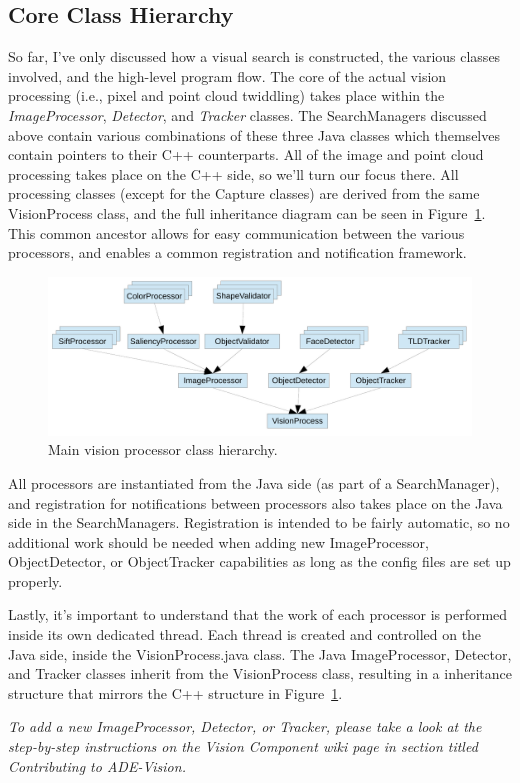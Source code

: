 \documentclass{article}
\begin{document}
\subsection{Core Class Hierarchy}
So far, I've only discussed how a visual search is constructed, the various
classes involved, and the high-level program flow. The core of the actual
vision processing (i.e., pixel and point cloud twiddling) takes place within
the {\em ImageProcessor}, {\em Detector}, and {\em Tracker} classes. The
SearchManagers discussed above contain various combinations of these
three Java classes which themselves contain pointers to their C++ counterparts.
All of the image and point cloud processing takes place on the C++ side,
so we'll turn our focus there. All processing classes (except for the Capture
classes) are derived from the same VisionProcess class, and the full inheritance
diagram can be seen in Figure~\ref{fig:vis_hierarchy}. This common ancestor allows
for easy communication between the various processors, and enables a common
registration and notification framework.

\begin{figure}[h]
  \centering
  \includegraphics[width=4.5in]{vision_main_hierarchy.pdf}
  \caption{Main vision processor class hierarchy.}
  \label{fig:vis_hierarchy}
\end{figure}

All processors are instantiated from the Java side (as part of a SearchManager),
and registration for notifications between processors also takes place on the Java side
in the SearchManagers. Registration is intended to be fairly automatic, so no additional
work should be needed when adding new ImageProcessor, ObjectDetector, or ObjectTracker
capabilities as long as the config files are set up properly.

Lastly, it's important to understand that the work of each processor is performed
inside its own dedicated thread. Each thread is created and controlled on the Java
side, inside the VisionProcess.java class. The Java ImageProcessor, Detector, and
Tracker classes inherit from the VisionProcess class, resulting in a inheritance
structure that mirrors the C++ structure in Figure~\ref{fig:vis_hierarchy}.

{\em To add a new ImageProcessor, Detector, or Tracker, please take a look at the step-by-step
instructions on the Vision Component wiki page in section titled Contributing to ADE-Vision.} 
\end{document}
